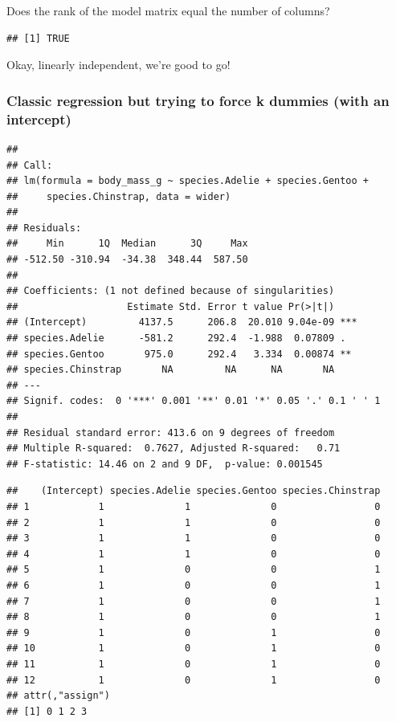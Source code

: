 \documentclass[
  openany]{book}
\begin{document}
Does the rank of the model matrix equal the number of columns?

\begin{verbatim}
## [1] TRUE
\end{verbatim}

Okay, linearly independent, we're good to go!

\hypertarget{classic-regression-but-trying-to-force-k-dummies-with-an-intercept}{%
\subsubsection{Classic regression but trying to force k dummies (with an intercept)}\label{classic-regression-but-trying-to-force-k-dummies-with-an-intercept}}

\begin{verbatim}
## 
## Call:
## lm(formula = body_mass_g ~ species.Adelie + species.Gentoo + 
##     species.Chinstrap, data = wider)
## 
## Residuals:
##     Min      1Q  Median      3Q     Max 
## -512.50 -310.94  -34.38  348.44  587.50 
## 
## Coefficients: (1 not defined because of singularities)
##                   Estimate Std. Error t value Pr(>|t|)    
## (Intercept)         4137.5      206.8  20.010 9.04e-09 ***
## species.Adelie      -581.2      292.4  -1.988  0.07809 .  
## species.Gentoo       975.0      292.4   3.334  0.00874 ** 
## species.Chinstrap       NA         NA      NA       NA    
## ---
## Signif. codes:  0 '***' 0.001 '**' 0.01 '*' 0.05 '.' 0.1 ' ' 1
## 
## Residual standard error: 413.6 on 9 degrees of freedom
## Multiple R-squared:  0.7627, Adjusted R-squared:   0.71 
## F-statistic: 14.46 on 2 and 9 DF,  p-value: 0.001545
\end{verbatim}

\begin{verbatim}
##    (Intercept) species.Adelie species.Gentoo species.Chinstrap
## 1            1              1              0                 0
## 2            1              1              0                 0
## 3            1              1              0                 0
## 4            1              1              0                 0
## 5            1              0              0                 1
## 6            1              0              0                 1
## 7            1              0              0                 1
## 8            1              0              0                 1
## 9            1              0              1                 0
## 10           1              0              1                 0
## 11           1              0              1                 0
## 12           1              0              1                 0
## attr(,"assign")
## [1] 0 1 2 3
\end{verbatim}
\end{document}

